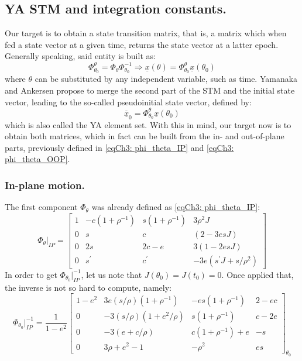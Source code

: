 	\subsection{YA STM and integration constants.}
	\indent Our target is to obtain a state transition matrix, that is, a matrix which when fed a state vector at a given time, returns the state vector at a latter epoch. Generally speaking, said entity is built as:
	\[
	\Phi_{\theta_0}^{\theta} = \Phi_{\theta} \Phi_{\theta_0}^{-1}	\Rightarrow \underline{x} \left(\theta\right) = \Phi_{\theta_0}^\theta \underline{x} \left(\theta_0 \right) 
	\]
	\noindent where $\theta$ can be substituted by any independent variable, such as time. Yamanaka and Ankersen propose to merge the second part of the STM and the initial state vector, leading to the so-called pseudoinitial state vector, defined by:
	\[
	\underline{\overline{x}}_0 =  \Phi_{\theta_0}^\theta \underline{x} \left(\theta_0 \right) 
	\]	
	\noindent which is also called the YA element set. With this in mind, our target now is to obtain both matrices, which in fact can be built from the in- and out-of-plane parts, previously defined in \eqref{eqCh3: phi_theta_IP} and \eqref{eqCh3: phi_theta_OOP}.
		\subsubsection{In-plane motion.}
		\indent The first component $\Phi_{\theta}$ was already defined as \eqref{eqCh3: phi_theta_IP}:
		\begin{equation}
		\Phi_{\theta}\rvert_{IP} = \left[ 
		\begin{array}{cccc}
		1 &  -c(1 + \rho^{-1}) & s(1 + \rho^{-1}) & 3 \rho^2 J \\
		0 & s & c & (2 - 3 e s J) \\
		0 & 2s & 2c - e & 3(1  - 2 e s J)\\
		0 & s^{\prime} & c^{\prime} & -3 e(s^{\prime} J + s / \rho^2 )
		\end{array}
		\right]
		\label{eqCh3: phi_IP}
		\end{equation}
		\indent In order to get $\Phi_{\theta_0}\rvert_{IP}^{-1}$, let us note that $J(\theta_0) = J(t_0) = 0$. Once applied that, the inverse is not so hard to compute, namely:
		\begin{equation}
		\Phi_{\theta_0}\rvert_{IP}^{-1} = 
		\dfrac{1}{1 - e^2}		
		\left[ 
		\begin{array}{cccc}
		1 - e^2 	& 3e(s/\rho) \left(1 + \rho^{-1}\right) 	& -es\left(1 + \rho^{-1}\right) 	& 2 - ec 	\\
		0 			& -3(s/\rho) \left(1 + e^2/\rho\right) 	& s\left(1 + \rho^{-1}\right) 		& c - 2e 	\\
		0		 	& -3 		\left(e + c/\rho\right) 	& c\left(1 + \rho^{-1}\right) + e 	& -s 		\\
		0		 	& 3\rho + e^2 - 1 						& -\rho^2 						& es 
		\end{array}
		\right]_{\theta_0}
		\label{eqCh3: phi_inv_IP}
		\end{equation}
